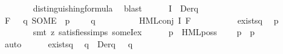 \begin{isabellebody}
\ \ \ \ \ \ \isamarkupfalse%
\ distinguishing{\isacharunderscore}{\kern0pt}formula\ \isamarkupfalse%
\ blast\isanewline
\isanewline
\ \ \ \ \isamarkupfalse%
\ {\isacharquery}{\kern0pt}I\ {\isacharequal}{\kern0pt}\ {\isacartoucheopen}Der{\isacharparenleft}{\kern0pt}q{\isacharcomma}{\kern0pt}\ {\isasymalpha}{\isacharparenright}{\kern0pt}{\isacartoucheclose}\isanewline
\ \ \ \ \isamarkupfalse%
\ {\isacharquery}{\kern0pt}F\ {\isacharequal}{\kern0pt}\ {\isacartoucheopen}{\isacharparenleft}{\kern0pt}{\isasymlambda}\ q{\isacharprime}{\kern0pt}{\isachardot}{\kern0pt}\ SOME\ {\isasymphi}{\isachardot}{\kern0pt}\ p{\isacharprime}{\kern0pt}\ {\isasymTurnstile}\ {\isasymphi}\ {\isasymand}\ {\isasymnot}\ q{\isacharprime}{\kern0pt}\ {\isasymTurnstile}\ {\isasymphi}{\isacharparenright}{\kern0pt}{\isacartoucheclose}\isanewline
\ \ \ \ \isamarkupfalse%
\ {\isacharquery}{\kern0pt}{\isasymphi}\ {\isacharequal}{\kern0pt}\ {\isacartoucheopen}HML{\isacharunderscore}{\kern0pt}conj\ {\isacharquery}{\kern0pt}I\ {\isacharquery}{\kern0pt}F{\isacartoucheclose}\isanewline
\ \ \ \ \isanewline
\ \ \ \ \isamarkupfalse%
\ {\isachardoublequoteopen}exists{\isacharunderscore}{\kern0pt}{\isasymphi}\isactrlbsub q{\isacharprime}{\kern0pt}\isactrlesub {\isachardoublequoteclose}\ \isamarkupfalse%
\ {\isacartoucheopen}p{\isacharprime}{\kern0pt}\ {\isasymTurnstile}\ {\isacharquery}{\kern0pt}{\isasymphi}{\isacartoucheclose}\isanewline
\ \ \ \ \ \ \isamarkupfalse%
\ {\isacharparenleft}{\kern0pt}smt\ {\isacharparenleft}{\kern0pt}z{}{\isacharparenright}{\kern0pt}\ satisfies{\isachardot}{\kern0pt}simps{\isacharparenleft}{\kern0pt}{}{\isacharparenright}{\kern0pt}\ someI{\isacharunderscore}{\kern0pt}ex{\isacharparenright}{\kern0pt}\isanewline
\ \ \ \ \isamarkupfalse%
\ {\isacartoucheopen}p\ {\isasymTurnstile}\ HML{\isacharunderscore}{\kern0pt}poss\ {\isasymalpha}\ {\isacharquery}{\kern0pt}{\isasymphi}{\isacartoucheclose}\ \isamarkupfalse%
\ {\isacartoucheopen}p\ {\isasymlongmapsto}{\isasymalpha}\ p{\isacharprime}{\kern0pt}{\isacartoucheclose}\isanewline
\ \ \ \ \ \ \isamarkupfalse%
\ auto\isanewline
\isanewline
\ \ \ \ \isamarkupfalse%
\ {\isachardoublequoteopen}exists{\isacharunderscore}{\kern0pt}{\isasymphi}\isactrlbsub q{\isacharprime}{\kern0pt}\isactrlesub {\isachardoublequoteclose}\ \isamarkupfalse%
\ {\isacartoucheopen}{\isasymforall}q{\isacharprime}{\kern0pt}\ {\isasymin}\ Der{\isacharparenleft}{\kern0pt}q{\isacharcomma}{\kern0pt}\ {\isasymalpha}{\isacharparenright}{\kern0pt}{\isachardot}{\kern0pt}\ {\isasymnot}\ q{\isacharprime}{\kern0pt}\ {\isasymTurnstile}\ {\isacharquery}{\kern0pt}{\isasymphi}{\isacartoucheclose}\isanewline

\end{isabellebody}
